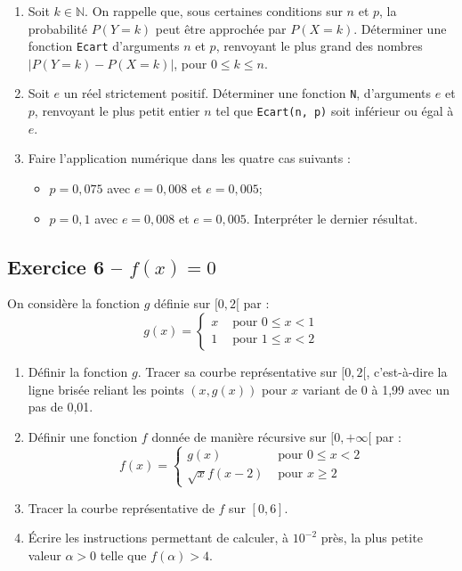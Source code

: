 \documentclass[10pt,fleqn]{article} %
\begin{document}
\begin{multicols}{2}
\begin{enumerate}
Déterminer, pour $n = 30$ et $p = 0,1$, la liste des valeurs de $P(Y = k)$ pour $k \in \mathbb{N}$, $0 \leq k \leq 30$.
\item Soit $k \in \mathbb{N}$. On rappelle que, sous certaines conditions sur $n$ et $p$, la probabilité $P(Y = k)$ peut être
approchée par $P(X = k)$. Déterminer une fonction \texttt{Ecart} d’arguments $n$ et $p$, renvoyant le plus grand
des nombres $|P(Y = k) - P(X = k)|$, pour $0 \leq k \leq n$.
\item Soit $e$ un réel strictement positif. Déterminer une fonction \texttt{N}, d’arguments $e$ et $p$, renvoyant le plus
petit entier $n$ tel que \texttt{Ecart(n, p)} soit inférieur ou égal à $e$.
\item Faire l’application numérique dans les quatre cas suivants :
\begin{itemize}
\item $p = 0,075$ avec $e = 0,008$ et $e = 0,005$;
\item $p = 0,1$ avec $e = 0,008$ et $e = 0,005$. Interpréter le dernier résultat.
\end{itemize}
\end{enumerate}


\subsection*{Exercice 6 -- $f(x)=0$}
On considère la fonction $g$ définie sur $[0 , 2[$ par :
$$ g(x) =
\left\{
\begin{array}{ll}
x &\text{ pour } 0\leq x < 1 \\
1 &\text{ pour } 1\leq x < 2 
\end{array}
\right.
$$
\begin{enumerate}
\item Définir la fonction $g$. Tracer sa courbe représentative sur $[0 , 2[$, c’est-à-dire la ligne brisée reliant les points $(x, g(x))$ pour $x$ variant de 0 à 1,99 avec un pas de 0,01.
\item Définir une fonction $f$ donnée de manière récursive sur $[0 , +\infty[$ par :
$$ f(x) =
\left\{
\begin{array}{ll}
g(x) &\text{ pour } 0\leq x < 2 \\
\sqrt{x} f(x-2) &\text{ pour } x \geq 2
\end{array}
\right.
$$
\item Tracer la courbe représentative de $f$ sur $[0,6]$.
\item Écrire les instructions permettant de calculer, à $10^{-2}$ près, la plus petite valeur $\alpha > 0$ telle que $f(\alpha) > 4$.
\end{enumerate}


\end{multicols}
\end{document}
